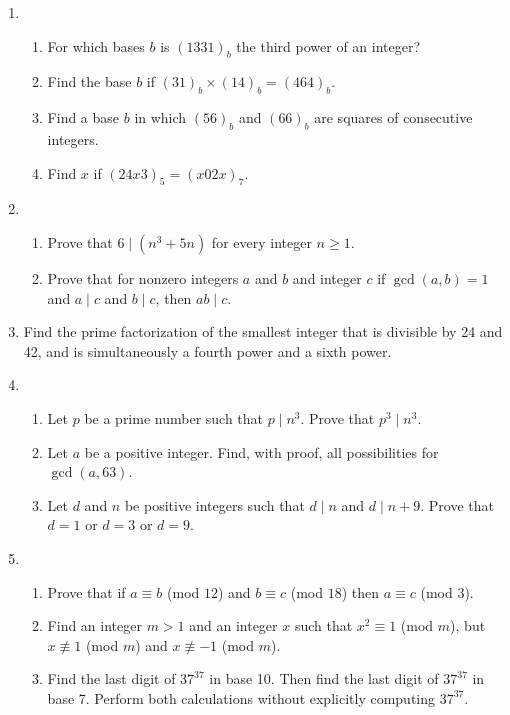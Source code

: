\documentclass[11 pt]{article}%
\begin{document}
\begin{enumerate}
\item \begin{enumerate}
\item For which bases $b$ is $(1331)_b$ the third power of an integer?
\item Find the base $b$ if $(31)_b \times (14)_b = (464)_b$.
\item Find a base $b$ in which $(56)_b$ and $(66)_b$ are squares of consecutive integers.
\item Find $x$ if $(24x3)_5 = (x02x)_7$.
\end{enumerate}

\item{
\begin{enumerate}
\item{
Prove that $6 \mid (n^3+5n)$ for every integer $n \geq 1$.
}
\item{Prove that for nonzero integers $a$ and $b$ and integer $c$ if $\gcd(a,b)=1$ and $a \mid c$ and $b \mid c$, then $ab \mid c$.

}
\end{enumerate}
}


\item Find the prime factorization of the smallest integer that is divisible by 24 and 42, and is simultaneously a fourth power and a sixth power.

\item
\begin{enumerate}
\item Let $p$ be a prime number such that $p\mid n^3$. Prove that $p^3 \mid n^3$.
\item Let $a$ be a positive integer. Find, with proof, all possibilities for $\gcd(a, 63)$.
\item Let $d$ and $n$ be positive integers such that $d\mid n$ and $d \mid n+9$. Prove that $d = 1$ or $d = 3$ or $d = 9$.
\end{enumerate}

\item
\begin{enumerate}
\item Prove that if $a\equiv b$ (mod $12$) and $b\equiv c$ (mod $18$) then $a\equiv c$ (mod $3$).

\item Find an integer $m > 1$ and an integer $x$ such that $x^2 \equiv 1$ (mod $m$), but $x \not\equiv 1$ (mod $m$) and $x \not\equiv -1$ (mod $m$).

\item Find the last digit of $37^{37}$ in base 10. Then find the last digit of $37^{37}$ in base 7. Perform both calculations without explicitly computing $37^{37}$.  

\end{enumerate}






\end{enumerate}
\end{document}
